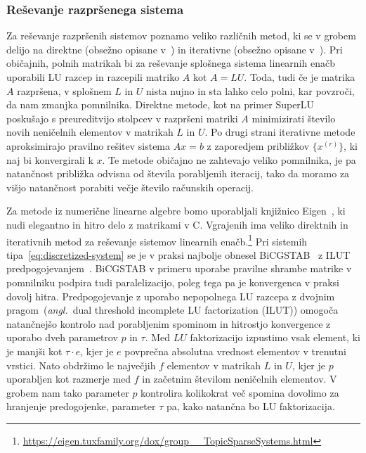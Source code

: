\documentclass[12pt,a4paper,twoside]{article}
\theoremstyle{definition} %
\theoremstyle{plain} %
\numberwithin{equation}{section}
\newcommand{\ang}[1]{(\textit{angl.}\ #1)}
\newcommand{\CC}{C\nolinebreak\hspace{-.05em}\raisebox{.4ex}{\tiny\bf +}\nolinebreak\hspace{-.10em}\raisebox{.4ex}{\tiny\bf +}}
\begin{document}
\subsubsection{Reševanje razpršenega sistema}
\label{sec:solve-sparse}
Za reševanje razpršenih sistemov poznamo veliko različnih metod, ki se v grobem
delijo na direktne (obsežno opisane v~\cite{davis2006direct}) in iterativne
(obsežno opisane v~\cite{saad2003iterative}).
Pri običajnih, polnih matrikah bi za reševanje splošnega sistema linearnih enačb
uporabili LU razcep in razcepili matriko $A$ kot $A = LU$. Toda, tudi če je
matrika $A$ razpršena, v splošnem $L$ in $U$ nista nujno in sta lahko celo
polni, kar povzroči, da nam zmanjka pomnilnika. Direktne metode, kot na primer
SuperLU~\cite{li2005overview} poskušajo s preureditvijo stolpcev v razpršeni
matriki $A$ minimizirati število novih neničelnih elementov v matrikah $L$ in
$U$. Po drugi strani iterativne metode aproksimirajo pravilno rešitev sistema
$Ax=b$ z zaporedjem približkov $\{x^{(r)}\}$, ki naj bi konvergirali k $x$. Te
metode običajno ne zahtevajo veliko pomnilnika, je pa natančnost približka
odvisna od števila porabljenih iteracij, tako da moramo za višjo natančnost
porabiti večje število računskih operacij.

Za metode iz numerične linearne algebre bomo uporabljali knjižnico
Eigen~\cite{eigenweb}, ki nudi elegantno in hitro delo z matrikami v \CC.
Vgrajenih ima veliko direktnih in iterativnih metod za reševanje sistemov
linearnih
enačb.\footnote{\url{https://eigen.tuxfamily.org/dox/group__TopicSparseSystems.html}
  \newline
[obiskano 17.\ 6.\ 2017]}
Pri sistemih tipa~\eqref{eq:discretized-system} se je
v praksi najbolje obnesel BiCGSTAB~\cite{van1992bi} z
ILUT predpogojevanjem~\cite{saad1994ilut}. BiCGSTAB v primeru uporabe pravilne
shrambe matrike v pomnilniku podpira tudi paralelizacijo, poleg tega pa je
konvergenca v praksi dovolj hitra. Predpogojevanje z uporabo nepopolnega LU
razcepa z dvojnim pragom~\ang{dual threshold incomplete LU factorization (ILUT)}
omogoča natančnejšo kontrolo nad porabljenim spominom in hitrostjo konvergence z
uporabo dveh parametrov $p$ in $\tau$. Med $LU$ faktorizacijo izpustimo vsak
element, ki je manjši kot $\tau\cdot e$, kjer je $e$ povprečna absolutna
vrednost elementov v trenutni vrstici. Nato obdržimo le največjih $f$ elementov
v matrikah $L$ in $U$, kjer je $p$ uporabljen kot razmerje med $f$ in začetnim
številom neničelnih elementov. V grobem nam tako parameter $p$ kontrolira
kolikokrat več spomina dovolimo za hranjenje predogojenke,
parameter $\tau$ pa, kako natančna bo LU faktorizacija.
\end{document}
